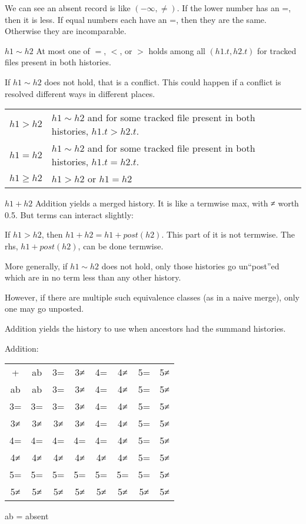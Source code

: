 \documentclass{book}
\begin{document}
We can see an absent record is like $(-\infty, ≠)$.
If the lower number has an =, then it is less.  If equal numbers each have an =, then they are the same.  Otherwise they are incomparable.

$h1 \sim h2$    At most one of $=$, $<$, or $>$ holds among all $(h1.t, h2.t)$ for tracked files present in both histories.

If $h1 \sim h2$ does not hold, that is a conflict.  This could happen if a conflict is resolved different ways in different places.

\begin{tabular}{lll}
$h1 > h2$  &  $h1 \sim h2$ and for some tracked file present in both histories, $h1.t > h2.t$. \\
$h1 = h2$  &  $h1 \sim h2$ and for some tracked file present in both histories, $h1.t = h2.t$. \\
$h1 ≥ h2$ &  $h1 > h2$ or $h1 = h2$ \\
\end{tabular}

$h1 + h2$    Addition yields a merged history.  It is like a termwise max, with ≠ worth 0.5.  But terms can interact slightly:

           If $h1 > h2$, then $h1 + h2 = h1 + post(h2)$.  This part of it is not termwise.  The rhs, $h1 + post(h2)$, can be done termwise.

           More generally, if $h1 \sim h2$ does not hold, only those histories go un``post''ed which are in no term less than any other history.

           However, if there are multiple such equivalence classes (as in a naive merge), only one may go unposted.

           Addition yields the history to use when ancestors had the summand histories.

Addition:
\begin{tabular}{cccccccc}
     +  &  ab  &  3=  &  3≠  &  4=  &  4≠  &  5=  &  5≠  \\
    ab  &  ab  &  3=  &  3≠  &  4=  &  4≠  &  5=  &  5≠  \\
    3=  &  3=  &  3=  &  3≠  &  4=  &  4≠  &  5=  &  5≠  \\
    3≠  &  3≠  &  3≠  &  3≠  &  4=  &  4≠  &  5=  &  5≠  \\
    4=  &  4=  &  4=  &  4=  &  4=  &  4≠  &  5=  &  5≠  \\
    4≠  &  4≠  &  4≠  &  4≠  &  4≠  &  4≠  &  5=  &  5≠  \\
    5=  &  5=  &  5=  &  5=  &  5=  &  5=  &  5=  &  5≠  \\
    5≠  &  5≠  &  5≠  &  5≠  &  5≠  &  5≠  &  5≠  &  5≠  \\
\end{tabular}
     ab = absent
\end{document}
